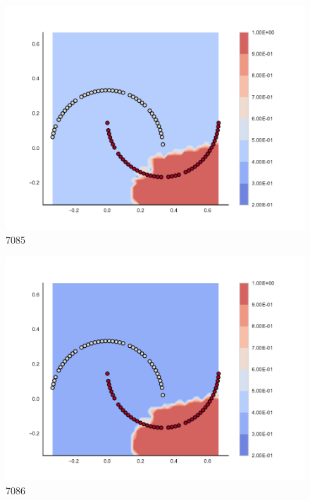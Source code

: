 \begin{subfigure}[b]{0.09\textwidth}
    \includegraphics[clip, trim=2.35cm 1.75cm 4.5cm 0cm,width=\textwidth]{img/convergence/7085.pdf}
    \caption{7085}
    \label{fig:convergence_7085}
\end{subfigure}
%
\begin{subfigure}[b]{0.09\textwidth}
    \includegraphics[clip, trim=2.35cm 1.75cm 4.5cm 0cm,width=\textwidth]{img/convergence/7086.pdf}
    \caption{7086}
    \label{fig:convergence_7086}
\end{subfigure}
%
